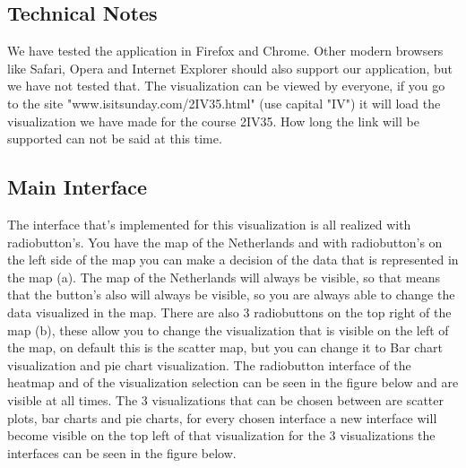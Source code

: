 \documentclass[a4paper,twoside,11pt]{article}
\begin{document}
\subsection{Technical Notes}
We have tested the application in Firefox and Chrome. Other modern browsers like Safari, Opera and Internet Explorer should also support our application, but we have not tested that. \newline
The visualization can be viewed by everyone, if you go to the site "www.isitsunday.com/2IV35.html" (use capital "IV") it will load the visualization we have made for the course 2IV35. How long the link will be supported can not be said at this time. \newline
\subsection{Main Interface}
The interface that's implemented for this visualization is all realized with radiobutton's. You have the map of the Netherlands and with radiobutton's on the left side of the map you can make a decision of the data that is represented in the map (a). The map of the Netherlands will always be visible, so that means that the button's also will always be visible, so you are always able to change the data visualized in the map. There are also 3 radiobuttons on the top right of the map (b), these allow you to change the visualization that is visible on the left of the map, on default this is the scatter map, but you can change it to Bar chart visualization and pie chart visualization. \newline
The radiobutton interface of the heatmap and of the visualization selection can be seen in the figure below and are visible at all times.\newline
The 3 visualizations that can be chosen between are scatter plots, bar charts and pie charts, for every chosen interface a new interface will become visible on the top left of that visualization for the 3 visualizations the interfaces can be seen in the figure below. \newline
\end{document}
